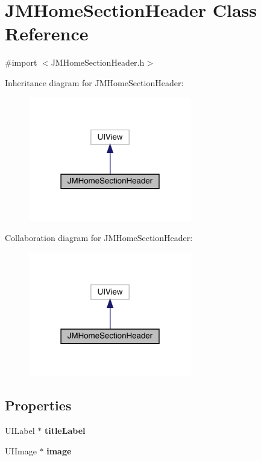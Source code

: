 \hypertarget{interface_j_m_home_section_header}{}\section{J\+M\+Home\+Section\+Header Class Reference}
\label{interface_j_m_home_section_header}


{\ttfamily \#import $<$J\+M\+Home\+Section\+Header.\+h$>$}



Inheritance diagram for J\+M\+Home\+Section\+Header\+:\nopagebreak
\begin{figure}[H]
\begin{center}
\leavevmode
\includegraphics[width=202pt]{interface_j_m_home_section_header__inherit__graph}
\end{center}
\end{figure}


Collaboration diagram for J\+M\+Home\+Section\+Header\+:\nopagebreak
\begin{figure}[H]
\begin{center}
\leavevmode
\includegraphics[width=202pt]{interface_j_m_home_section_header__coll__graph}
\end{center}
\end{figure}
\subsection*{Properties}
\begin{DoxyCompactItemize}
\item 
\mbox{\label{interface_j_m_home_section_header_ae832f6f677c0e3b94484e5154f80a6d4}} 
U\+I\+Label $\ast$ {\bfseries title\+Label}
\item 
\mbox{\label{interface_j_m_home_section_header_a68670663e3cefac8756dd8b0384007d8}} 
U\+I\+Image $\ast$ {\bfseries image}
\end{DoxyCompactItemize}


